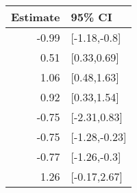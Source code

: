 \begin{tabular}{rl}
  \hline
Estimate & 95\% CI \\ 
  \hline
-0.99 & [-1.18,-0.8] \\ 
  0.51 & [0.33,0.69] \\ 
  1.06 & [0.48,1.63] \\ 
  0.92 & [0.33,1.54] \\ 
  -0.75 & [-2.31,0.83] \\ 
  -0.75 & [-1.28,-0.23] \\ 
  -0.77 & [-1.26,-0.3] \\ 
  1.26 & [-0.17,2.67] \\ 
   \hline
\end{tabular}

